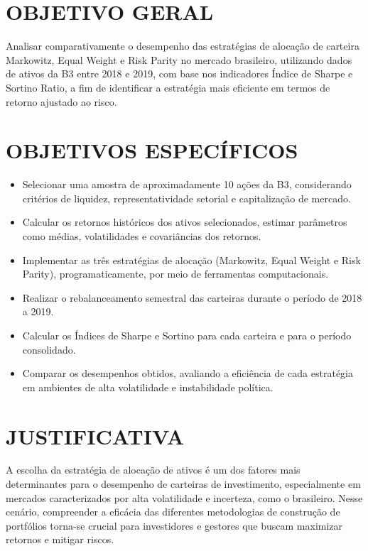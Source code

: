 \section{OBJETIVO GERAL}

Analisar comparativamente o desempenho das estratégias de alocação de carteira Markowitz, Equal Weight e Risk Parity no mercado brasileiro, utilizando dados de ativos da B3 entre 2018 e 2019, com base nos indicadores Índice de Sharpe e Sortino Ratio, a fim de identificar a estratégia mais eficiente em termos de retorno ajustado ao risco.

\section{OBJETIVOS ESPECÍFICOS}

\begin{itemize}
    \item Selecionar uma amostra de aproximadamente 10 ações da B3, considerando critérios de liquidez, representatividade setorial e capitalização de mercado.
    
    \item Calcular os retornos históricos dos ativos selecionados, estimar parâmetros como médias, volatilidades e covariâncias dos retornos.
    
    \item Implementar as três estratégias de alocação (Markowitz, Equal Weight e Risk Parity), programaticamente, por meio de ferramentas computacionais.
    
    \item Realizar o rebalanceamento semestral das carteiras durante o período de 2018 a 2019.
    
    \item Calcular os Índices de Sharpe e Sortino para cada carteira e para o período consolidado.
    
    \item Comparar os desempenhos obtidos, avaliando a eficiência de cada estratégia em ambientes de alta volatilidade e instabilidade política.
\end{itemize}

\section{JUSTIFICATIVA}

A escolha da estratégia de alocação de ativos é um dos fatores mais determinantes para o desempenho de carteiras de investimento, especialmente em mercados caracterizados por alta volatilidade e incerteza, como o brasileiro. Nesse cenário, compreender a eficácia das diferentes metodologias de construção de portfólios torna-se crucial para investidores e gestores que buscam maximizar retornos e mitigar riscos.

